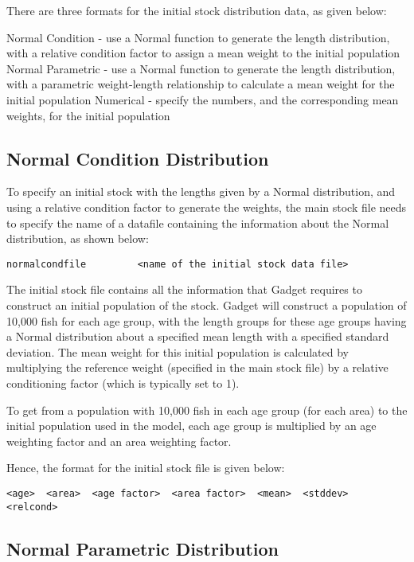 \documentclass[]{book}
\begin{document}
There are three formats for the initial stock distribution data, as
given below:

Normal Condition - use a Normal function to generate the length
distribution, with a relative condition factor to assign a mean weight
to the initial population Normal Parametric - use a Normal function to
generate the length distribution, with a parametric weight-length
relationship to calculate a mean weight for the initial population
Numerical - specify the numbers, and the corresponding mean weights, for
the initial population

\hypertarget{normal-condition-distribution}{%
\subsection{Normal Condition Distribution}\label{normal-condition-distribution}}

To specify an initial stock with the lengths given by a Normal
distribution, and using a relative condition factor to generate the
weights, the main stock file needs to specify the name of a datafile
containing the information about the Normal distribution, as shown
below:

\begin{verbatim}
normalcondfile         <name of the initial stock data file>
\end{verbatim}

The initial stock file contains all the information that Gadget requires
to construct an initial population of the stock. Gadget will construct a
population of 10,000 fish for each age group, with the length groups for
these age groups having a Normal distribution about a specified mean
length with a specified standard deviation. The mean weight for this
initial population is calculated by multiplying the reference weight
(specified in the main stock file) by a relative conditioning factor
(which is typically set to 1).

To get from a population with 10,000 fish in each age group (for each
area) to the initial population used in the model, each age group is
multiplied by an age weighting factor and an area weighting factor.

Hence, the format for the initial stock file is given below:

\begin{verbatim}
<age>  <area>  <age factor>  <area factor>  <mean>  <stddev>  <relcond>
\end{verbatim}

\hypertarget{normal-parametric-distribution}{%
\subsection{Normal Parametric Distribution}\label{normal-parametric-distribution}}
\end{document}

